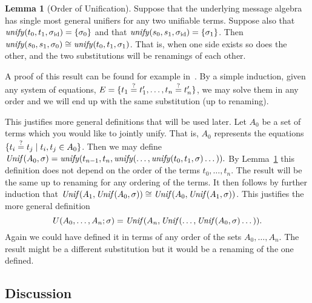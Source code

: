 \documentclass[12pt]{article}
\theoremstyle{definition}
\newtheorem{lem}[thm]{Lemma}
\begin{document}
\begin{lem}[Order of Unification]\label{lem:unification}
Suppose that the underlying message algebra has single most general unifiers
for any two unifiable terms.  Suppose also that
$\operatorname{\mathit{unify}}(t_0,t_1,\sigma_{\mathrm{id}})=\{\sigma_0\}$ and that
$\operatorname{\mathit{unify}}(s_0,s_1,\sigma_{\mathrm{id}})=\{\sigma_1\}$.  Then
$\operatorname{\mathit{unify}}(s_0,s_1,\sigma_0)\cong \operatorname{\mathit{unify}}(t_0,t_1,\sigma_1)$.
That is, when one side exists so does the other, and the two
substitutions will be renamings of each other.
\end{lem}

A proof of this result can be found for example in~\cite{BaaderNipkow98}.
By a simple induction, given any system of equations,
$E=\{t_1\eqq t_1',\ldots,t_n\eqq t_n'\}$, we may solve them in
any order and we will end up with the same substitution (up to
renaming).

This justifies more general definitions that will be used later.
Let $A_0$ be a set of terms which you would like to jointly unify.
That is, $A_0$ represents the equations $\{t_i\stackrel{?}{=} t_j\mid t_i,t_j\in A_0\}$.
Then we may define
$\operatorname{\mathit{Unif}}(A_0,\sigma)=\operatorname{\mathit{unify}}(t_{n-1},t_n,\operatorname{\mathit{unify}}(\dots ,\operatorname{\mathit{unify}}(t_0,t_1,\sigma)\dots)).$
By Lemma~\ref{lem:unification} this definition does not depend on the order
of the terms $t_0,\dots,t_n$.  The result will be the same up to renaming
for any ordering of the terms.
It then follows by further induction that
$\operatorname{\mathit{Unif}}(A_1,\operatorname{\mathit{Unif}}(A_0,\sigma))\cong \operatorname{\mathit{Unif}}(A_0,\operatorname{\mathit{Unif}}(A_1,\sigma))$.
This justifies the more general definition
$$U(A_0,\dots,A_n;\sigma)=\operatorname{\mathit{Unif}}(A_n,\operatorname{\mathit{Unif}}(\dots ,\operatorname{\mathit{Unif}}(A_0,\sigma)\dots)).$$
Again we could have defined it in terms of any order of the
sets $A_0,\dots,A_n$.  The result might be a different substitution
but it would be a renaming of the one defined.

\iffalse
When solving a system of equations $E=\{t_1\eqq t_1',\ldots,t_n\eqq
t_n'\}$, we rely on the fact that the order is which the equations are
solved is irrelevant in the following sense.  Let $\mcsu(E)$ be a
minimal complete set of unifiers that solves~$E$,
i.e.\ $\sigma\in\mcsu(E)$ and $t\eqq t'\in E$ implies $\sigma(t)\equiv
\sigma(t')$.  Let $E=E_0\uplus E_1$ be a partition of~$E$, and
let~$S=\{\sigma_1\circ\sigma_0\mid\sigma_0\in\mcsu(E_0)\land
\sigma_1\in\mcsu(\sigma_0(E_1))\}$.  Then~$S$ is a complete set of
unifiers that solve~$E$.
\fi

\subsection*{Discussion}
\end{document}
